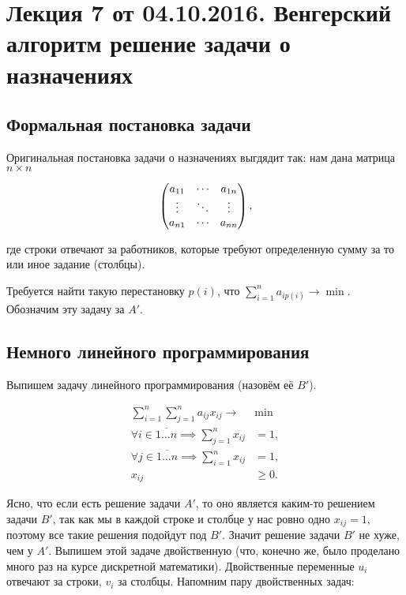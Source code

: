 \documentclass[a4paper, 12pt]{article}
\begin{document}
\pagestyle{fancy}

\section{Лекция 7 от 04.10.2016. Венгерский алгоритм решение задачи о назначениях}

\subsection{Формальная постановка задачи}
Оригинальная постановка задачи о назначениях
выгдядит так: нам дана матрица $n \times n$

\[
  \begin{pmatrix}
    a_{11} & \cdots & a_{1n} \cr 
    \vdots & \ddots & \vdots \cr 
    a_{n1} & \cdots & a_{nn}
  \end{pmatrix},
\]

где строки отвечают за работников, которые требуют определенную сумму за то
или иное задание (столбцы).

Требуется найти такую перестановку $p(i)$, что $\sum\limits_{i = 1}^{n} 
a_{ip(i)} \to \min.$  Обозначим эту задачу за $A'$.

\subsection{Немного линейного программирования}

Выпишем задачу линейного программирования (назовём её $B'$).

\begin{align*}
  \sum\limits_{i = 1}^n \sum\limits_{j = 1}^n a_{ij}x_{ij} \to & \min\\
  \forall i \in \overline{1\ldots n} \implies \sum\limits_{j = 1}^n x_{ij} &= 1,\\
  \forall j \in \overline{1\ldots n} \implies \sum\limits_{i = 1}^n x_{ij} &= 1,\\
  x_{ij} &\geqslant 0.
\end{align*}

Ясно, что если есть решение задачи $A'$, то оно является каким-то решением задачи $B'$,
так как мы в каждой строке и столбце у нас ровно одно $x_{ij} = 1$, поэтому
все такие решения подойдут под $B'$. Значит решение задачи $B'$ не хуже, чем у
$A'$. Выпишем этой задаче двойственную (что, конечно же, было проделано
много раз на курсе дискретной математики). Двойственные переменные $u_i$ отвечают
за строки, $v_i$ за столбцы. Напомним пару двойственных задач:
\end{document}
